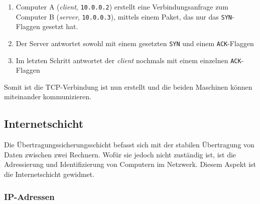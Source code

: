 \begin{enumerate}
\item Computer A (\textit{client}, \texttt{10.0.0.2}) erstellt eine Verbindungsanfrage zum Computer B (\textit{server}, \texttt{10.0.0.3}), mittels einem Paket, das nur das \texttt{SYN}-Flaggen gesetzt hat.
\item Der Server antwortet sowohl mit einem gesetzten \texttt{SYN} und einem \texttt{ACK}-Flaggen
\item Im letzten Schritt antwortet der \textit{client} nochmals mit einem einzelnen \texttt{ACK}-Flaggen\\
\end{enumerate}
Somit ist die \gls{TCP}-Verbindung ist nun erstellt und die beiden Maschinen können miteinander kommunizieren.

\subsection{Internetschicht}
Die Übertragungssicherungsschicht befasst sich mit der stabilen Übertragung von Daten zwischen zwei Rechnern. Wofür sie jedoch nicht zuständig ist, ist die Adressierung und Identifizierung von Computern im Netzwerk. Diesem Aspekt ist die Internetschicht gewidmet.

\subsubsection{IP-Adressen}

